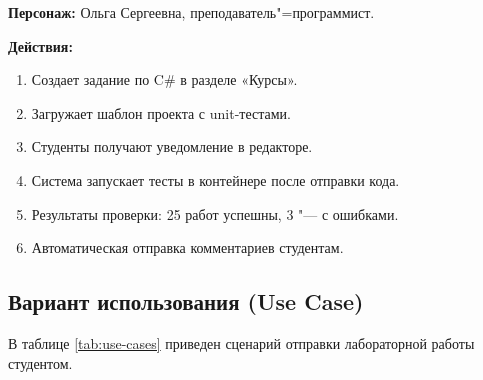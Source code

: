 \documentclass{bsuir}
\begin{document}
\textbf{Персонаж:} Ольга Сергеевна, преподаватель"=программист.

\textbf{Действия:}
\begin{enumerate}
    \item Создает задание по C\# в разделе «Курсы».
    \item Загружает шаблон проекта с unit-тестами.
    \item Студенты получают уведомление в редакторе.
    \item Система запускает тесты в контейнере после отправки кода.
    \item Результаты проверки: 25 работ успешны, 3 "--- с ошибками.
    \item Автоматическая отправка комментариев студентам.
\end{enumerate}

\subsection*{Вариант использования (Use Case)}

В таблице \ref{tab:use-cases} приведен сценарий отправки лабораторной работы
студентом.
\end{document}
